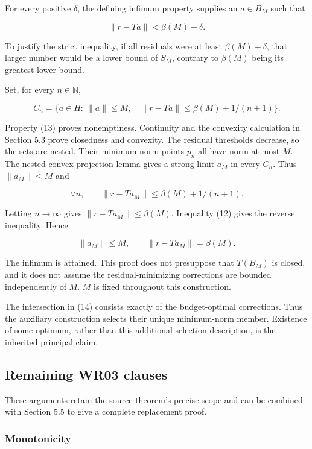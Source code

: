 \documentclass[11pt]{article}
\begin{document}
For every positive \(\delta\), the defining infimum property supplies an
\(a \in B_M\) such that

\[
\|r-Ta\|<\beta(M)+\delta.                          \tag{13}
\]

To justify the strict inequality, if all residuals were at least
\(\beta(M)+\delta\), that larger number would be a lower bound of
\(S_M\), contrary to \(\beta(M)\) being its greatest lower bound.

Set, for every \(n \in \mathbb{N}\),

\[
C_n=\{a\in H:\ \|a\|\le M,\quad
           \|r-Ta\|\le\beta(M)+1/(n+1)\}.          \tag{14}
\]

Property (13) proves nonemptiness. Continuity and the convexity
calculation in Section 5.3 prove closedness and convexity. The residual
thresholds decrease, so the sets are nested. Their minimum-norm points
\(p_n\) all have norm at most \(M\). The nested convex projection lemma
gives a strong limit \(a_M\) in every \(C_n\). Thus \(\|a_M\| \le M\)
and

\[
\forall n,\qquad
\|r-Ta_M\|\le\beta(M)+1/(n+1).
\]

Letting \(n \to \infty\) gives \(\|r-Ta_M\| \le \beta(M)\). Inequality
(12) gives the reverse inequality. Hence

\[
\|a_M\|\le M,\qquad \|r-Ta_M\|=\beta(M).          \tag{15}
\]

The infimum is attained. This proof does not presuppose that \(T(B_M)\)
is closed, and it does not assume the residual-minimizing corrections
are bounded independently of \(M\). \(M\) is fixed throughout this
construction.

The intersection in (14) consists exactly of the budget-optimal
corrections. Thus the auxiliary construction selects their unique
minimum-norm member. Existence of some optimum, rather than this
additional selection description, is the inherited principal claim.

\hypertarget{remaining-wr03-clauses}{%
\subsection{Remaining WR03 clauses}\label{remaining-wr03-clauses}}

These arguments retain the source theorem's precise scope and can be
combined with Section 5.5 to give a complete replacement proof.

\hypertarget{monotonicity}{%
\subsubsection{Monotonicity}\label{monotonicity}}
\end{document}
